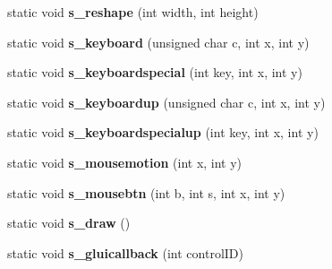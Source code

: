 \begin{DoxyCompactItemize}
\item 
\hypertarget{classBaseGfxApp_a5fe6a77d37044cbe28647ed3391bbb7a}{static void {\bfseries s\-\_\-reshape} (int width, int height)}\label{classBaseGfxApp_a5fe6a77d37044cbe28647ed3391bbb7a}

\item 
\hypertarget{classBaseGfxApp_a52edb2569227319feb68779844e7d857}{static void {\bfseries s\-\_\-keyboard} (unsigned char c, int x, int y)}\label{classBaseGfxApp_a52edb2569227319feb68779844e7d857}

\item 
\hypertarget{classBaseGfxApp_a1e8d90a4faab60300ddf2a4ea9b83115}{static void {\bfseries s\-\_\-keyboardspecial} (int key, int x, int y)}\label{classBaseGfxApp_a1e8d90a4faab60300ddf2a4ea9b83115}

\item 
\hypertarget{classBaseGfxApp_aa1ca205af9d6cee33949f2e6adf4c923}{static void {\bfseries s\-\_\-keyboardup} (unsigned char c, int x, int y)}\label{classBaseGfxApp_aa1ca205af9d6cee33949f2e6adf4c923}

\item 
\hypertarget{classBaseGfxApp_a0e4dfe006f3cc9126c1cc8ad32784f75}{static void {\bfseries s\-\_\-keyboardspecialup} (int key, int x, int y)}\label{classBaseGfxApp_a0e4dfe006f3cc9126c1cc8ad32784f75}

\item 
\hypertarget{classBaseGfxApp_a5e640f2394f7e038d0dd2b469d5c2e24}{static void {\bfseries s\-\_\-mousemotion} (int x, int y)}\label{classBaseGfxApp_a5e640f2394f7e038d0dd2b469d5c2e24}

\item 
\hypertarget{classBaseGfxApp_a22dd953bfb75add9fd0f8f2f8be535c5}{static void {\bfseries s\-\_\-mousebtn} (int b, int s, int x, int y)}\label{classBaseGfxApp_a22dd953bfb75add9fd0f8f2f8be535c5}

\item 
\hypertarget{classBaseGfxApp_a58415c6151a2a80e1fe2eaa9919a4dab}{static void {\bfseries s\-\_\-draw} ()}\label{classBaseGfxApp_a58415c6151a2a80e1fe2eaa9919a4dab}

\item 
\hypertarget{classBaseGfxApp_ad4a963321f1147d68369225ab0c7f32f}{static void {\bfseries s\-\_\-gluicallback} (int control\-I\-D)}\label{classBaseGfxApp_ad4a963321f1147d68369225ab0c7f32f}

\end{DoxyCompactItemize}
